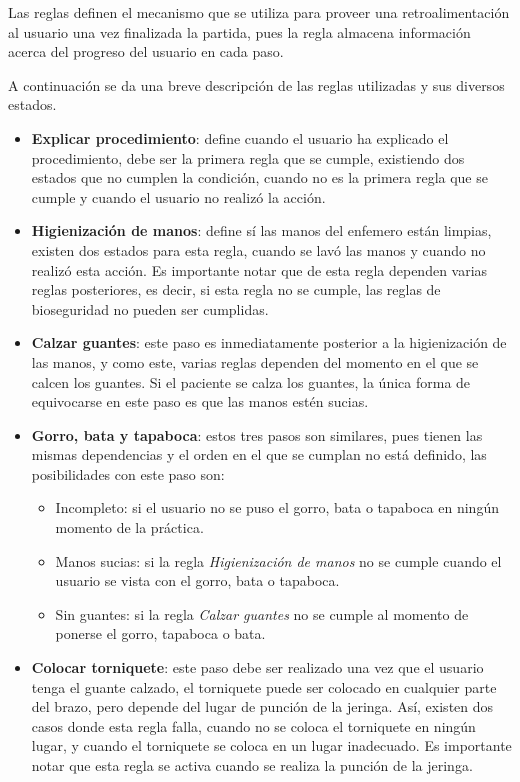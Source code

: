 Las reglas definen el mecanismo que se utiliza para proveer una retroalimentación
al usuario una vez finalizada la partida, pues la regla almacena información 
acerca del progreso del usuario en cada paso.

A continuación se da una breve descripción de las reglas utilizadas y sus
diversos estados.

\begin{itemize}
\item \textbf{Explicar procedimiento}: define cuando el usuario ha explicado el
    procedimiento, debe ser la primera regla que se cumple, existiendo dos
    estados que no cumplen la condición, cuando no es la primera regla que se
    cumple y cuando el usuario no realizó la acción.

\item \textbf{Higienización de manos}: define sí las manos del enfemero están
    limpias, existen dos estados para esta regla, cuando se lavó las manos y
    cuando no realizó esta acción. Es importante notar que de esta regla
    dependen varias reglas posteriores, es decir, si esta regla no se cumple,
    las reglas de bioseguridad no pueden ser cumplidas.

\item \textbf{Calzar guantes}: este paso es inmediatamente posterior a la
    higienización de las manos, y como este, varias reglas dependen del momento
    en el que se calcen los guantes. Si el paciente se calza los guantes, la
    única forma de equivocarse en este paso es que las manos estén sucias.

\item \textbf{Gorro, bata y tapaboca}: estos tres pasos son similares, pues
    tienen las mismas dependencias y el orden en el que se cumplan no está
    definido, las posibilidades con este paso son:
    \begin{itemize}
    \item Incompleto: si el usuario no se puso el gorro, bata o tapaboca en
        ningún momento de la práctica.
    \item Manos sucias: si la regla \emph{Higienización de manos} no se cumple
        cuando el usuario se vista con el gorro, bata o tapaboca.
    \item Sin guantes: si la regla \emph{Calzar guantes} no se cumple al momento
        de ponerse el gorro, tapaboca o bata. 
    \end{itemize}
    
\item \textbf{Colocar torniquete}: este paso debe ser realizado una vez que el
    usuario tenga el guante calzado, el torniquete puede ser colocado en
    cualquier parte del brazo, pero depende del lugar de punción de la jeringa.
    Así, existen dos casos donde esta regla falla, cuando no se coloca el
    torniquete en ningún lugar, y cuando el torniquete se coloca en un lugar
    inadecuado. Es importante notar que esta regla se activa cuando se realiza
    la punción de la jeringa.


\end{itemize}
